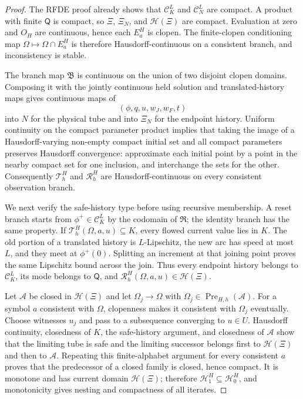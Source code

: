 \documentclass[11pt]{article}
\theoremstyle{definition}
\newcommand{\Pre}{\operatorname{Pre}}
\begin{document}
\begin{proof}
The RFDE proof already shows that $\mathscr C_K^L$ and
$\mathscr C_N^L$ are compact.  A product with finite $\mathsf Q$ is compact,
so $\Xi$, $\Xi_N$, and $\mathcal H(\Xi)$ are compact.  Evaluation at zero
and $O_H$ are continuous, hence each $E_a^H$ is clopen.  The
finite-clopen conditioning map
$\Omega\mapsto\Omega\cap E_a^H$ is therefore Hausdorff-continuous on a
consistent branch, and inconsistency is stable.

The branch map $\mathfrak B$ is continuous on the union of two disjoint
clopen domains.  Composing it with the jointly continuous held solution and
translated-history maps gives continuous maps of
\[
(\phi,q,u,w_J,w_F,t)
\]
into $N$ for the physical tube and into $\Xi_N$ for the endpoint history.
Uniform continuity on the compact parameter product implies that taking the
image of a Hausdorff-varying non-empty compact initial set and all compact
parameters preserves Hausdorff convergence: approximate each initial point
by a point in the nearby compact set for one inclusion, and interchange the
sets for the other.  Consequently $\mathscr T_h^H$ and
$\mathscr R_h^H$ are Hausdorff-continuous on every consistent observation
branch.

We next verify the safe-history type before using recursive membership.  A
reset branch starts from $\phi^+\in\mathscr C_K^L$ by the codomain of
$\mathfrak R$; the identity branch has the same property.  If
$\mathscr T_h^H(\Omega,a,u)\subseteq K$, every flowed current value lies in
$K$.  The old portion of a translated history is $L$-Lipschitz, the new arc
has speed at most $L$, and they meet at $\phi^+(0)$.  Splitting an increment
at that joining point proves the same Lipschitz bound across the join.
Thus every endpoint history belongs to $\mathscr C_K^L$, its mode belongs
to $\mathsf Q$, and
$\mathscr R_h^H(\Omega,a,u)\in\mathcal H(\Xi)$.

Let $\mathcal A$ be closed in $\mathcal H(\Xi)$ and let
$\Omega_j\to\Omega$ with
$\Omega_j\in\Pre_{H,h}(\mathcal A)$.  For a symbol $a$ consistent with
$\Omega$, clopenness makes it consistent with $\Omega_j$ eventually.
Choose witnesses $u_j$ and pass to a subsequence converging to $u\in U$.
Hausdorff continuity, closedness of $K$, the safe-history argument, and
closedness of $\mathcal A$ show that the limiting tube is safe and the
limiting successor belongs first to $\mathcal H(\Xi)$ and then to
$\mathcal A$.  Repeating this finite-alphabet argument for every consistent
$a$ proves that the predecessor of a closed family is closed, hence compact.
It is monotone and has current domain $\mathcal H(\Xi)$; therefore
$\mathcal H_1^H\subseteq\mathcal H_0^H$, and monotonicity gives nesting and
compactness of all iterates.


\end{proof}
\end{document}
